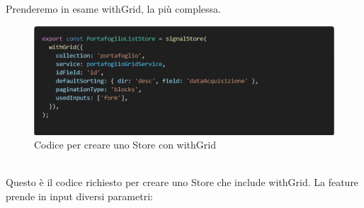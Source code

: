 Prenderemo in esame withGrid, la pi\`u complessa.
\\
\begin{figure}[H]
  \centering
  \includegraphics[width=12cm]{images/code-store.png}
  \caption{Codice per creare uno Store con withGrid}
\end{figure}
\textbf{}\\
Questo \`e il codice richiesto per creare uno Store che include withGrid. La feature prende in input diversi parametri:
